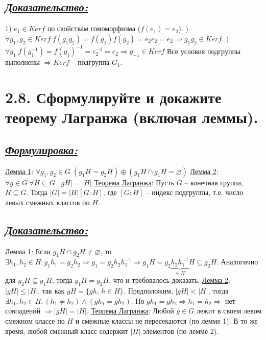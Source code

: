 \documentclass{article}
\begin{document}
\subsection*{\Large \underline{\textit{Доказательство: }}}
1) $e_1 \in Kerf$ по свойствам гомоморфизма ($f(e_1) = e_2$).
) $\forall g_1, g_2 \in Kerf \; f(g_1g_2) = f(g_1)f(g_2) = e_2e_2 = e_2 \Rightarrow g_1g_2 \in Kerf$.
) $\forall g_1 \; f(g_1^{-1}) = f(g_1)^{-1} = e_2^{-1} = e_2 \Rightarrow g_{-1} \in Kerf$
\newline Все условия подгруппы выполнены $\Rightarrow Kerf$ -- подгруппа $G_1$.

\section*{\LARGE 2.8. Сформулируйте и докажите теорему Лагранжа (включая леммы).}
\subsection*{\Large \underline{\textit{Формулировка: }}}
\underline{Лемма 1}:
\newline $\forall g_1, g_2 \in G \; (g_1H = g_2H) \oplus (g_1H \cap g_1H = \varnothing)$
\newline \underline{Лемма 2}:
\newline $\forall g \in G \: \forall H \subseteq G \;\; |gH| = |H|$
\newline \underline{Теорема Лагранжа}:
\newline Пусть $G$ -- конечная группа, $H \subseteq G$. Тогда $|G| = |H|[G : H]$, где $[G : H]$ -- индекс подгруппы, т.е. число левых смежных классов по $H$.

\subsection*{\Large \underline{\textit{Доказательство: }}}
\underline{Лемма 1}:
\newline Если $g_1H \cap g_2H \ne \varnothing$, то $\exists h_1, h_2 \in H : g_1h_1 = g_2h_2 \Rightarrow g_1 = g_2h_2h_1^{-1} \Rightarrow g_1H = g_2\underbrace{h_2h_1^{-1}}_{\in H}H \subseteq g_2H$. Аналогично для $g_2H \subseteq g_1H$, тогда $g_1H = g_2H$, что и требовалось доказать.
\newline \underline{Лемма 2}:
\newline $|gH| \le |H|$, так как $gH = \{gh,\, h \in H\}$. Предположим, $|gH| < |H|$, тогда $\exists h_1, h_2 \in H : (h_1 \ne h_2)\wedge(gh_1 = gh_2)$. Но $gh_1 = gh_2 \Rightarrow h_1 = h_2 \Rightarrow$ нет совпадений $\Rightarrow |gH| = |H|$.
\newline \underline{Теорема Лагранжа}:
\newline Любой $g \in G$ лежит в своем левом смежном классе по $H$ и смежные классы не пересекаются (по лемме 1). В то же время, любой смежный класс содержит $|H|$ элементов (по лемме 2).
\end{document}
